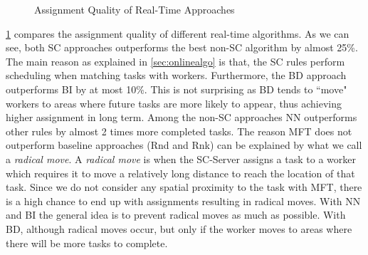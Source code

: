 \begin{figure}[h]
    \centering
    \vspace{-0.15in}
    \caption{Assignment Quality of Real-Time Approaches}
    \label{fig:quality}
\end{figure}

\cref{fig:quality} compares the assignment quality of different real-time algorithms. As we can see, both SC approaches outperforms the best non-SC algorithm by almost 25\%. The main reason as explained in \cref{sec:onlinealgo} is that, the SC rules perform scheduling when matching tasks with workers. Furthermore, the BD approach outperforms BI by at most 10\%. This is not surprising as BD tends to ``move" workers to areas where future tasks are more likely to appear, thus achieving higher assignment in long term. Among the non-SC approaches NN outperforms other rules by almost 2 times more completed tasks. The reason MFT does not outperform baseline approaches (Rnd and Rnk) can be explained by what we call a \emph{radical move}. A \emph{radical move} is when the SC-Server assigns a task to a worker which requires it to move a relatively long distance to reach the location of that task. Since we do not consider any spatial proximity to the task with MFT, there is a high chance to end up with assignments resulting in radical moves. With NN and BI the general idea is to prevent radical moves as much as possible. With BD, although radical moves occur, but only if the worker moves to areas where there will be more tasks to complete. 

